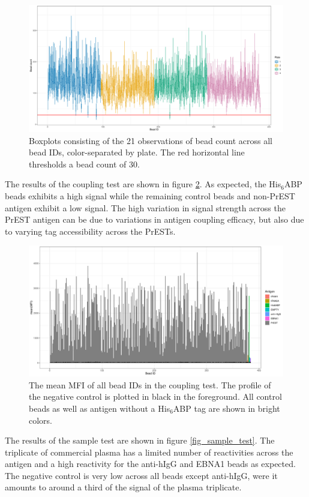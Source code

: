 \documentclass{article}
\begin{document}
\begin{figure}[H]
	\centering
	\includegraphics[width=0.8\linewidth]{figures/count_384.pdf}
	\caption{Boxplots consisting of the 21 observations of bead count across all bead IDs, color-separated by plate. The red horizontal line thresholds a bead count of 30.}
	\label{count_384}
\end{figure}

\newpage
The results of the coupling test are shown in figure \ref{fig_coupling_test}. As expected, the His$_6$ABP beads exhibits a high signal while the remaining control beads and non-PrEST antigen exhibit a low signal. The high variation in signal strength across the PrEST antigen can be due to variations in antigen coupling efficacy, but also due to varying tag accessibility across the PrESTs.

\begin{figure}[H]
	\centering
	\hspace*{2mm}\includegraphics[width=\linewidth]{figures/coupling.pdf}
	\caption{The mean MFI of all bead IDs in the coupling test. The profile of the negative control is plotted in black in the foreground. All control beads as well as antigen without a His$_6$ABP tag are shown in bright colors.}
	\label{fig_coupling_test}
\end{figure}

The results of the sample test are shown in figure \ref{fig_sample_test}. The triplicate of commercial plasma has a limited number of reactivities across the antigen and a high reactivity for the anti-hIgG and EBNA1 beads as expected. The negative control is very low across all beads except anti-hIgG, were it amounts to around a third of the signal of the plasma triplicate.
\end{document}
